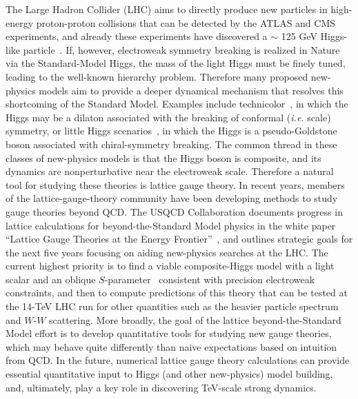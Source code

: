 The Large Hadron Collider (LHC) aims to directly produce new particles in
high-energy proton-proton collisions that can be detected by the ATLAS and CMS
experiments, and already these experiments have discovered a $\sim$ 125 GeV
Higgs-like particle~\cite{Aad:2012tfa,Chatrchyan:2012ufa}.  If, however,
electroweak symmetry breaking is realized in Nature via the Standard-Model
Higgs, the mass of the light Higgs must be finely tuned, leading to the
well-known hierarchy problem.  Therefore many proposed new-physics models aim
to provide a deeper dynamical mechanism that resolves this shortcoming of the
Standard Model.  Examples include technicolor~\cite{Farhi:1980xs,Hill:2002ap},
in which the Higgs may be a dilaton associated with the breaking of conformal
({\it i.e.} scale) symmetry, or little Higgs
scenarios~\cite{Kaplan:1983sm,ArkaniHamed:2002pa,ArkaniHamed:2002qy}, in which
the Higgs is a pseudo-Goldstone boson associated with chiral-symmetry
breaking.  The common thread in these classes of new-physics models is that
the Higgs boson is composite, and its dynamics are nonperturbative near the
electroweak scale.  Therefore a natural tool for studying these theories is
lattice gauge theory.  In recent years, members of the lattice-gauge-theory
community have been developing methods to study gauge theories beyond QCD.
The USQCD Collaboration documents progress in lattice calculations for
beyond-the-Standard Model physics in the white paper ``Lattice Gauge Theories
at the Energy Frontier''~\cite{USQCD_EF_whitepaper13}, and outlines strategic
goals for the next five years focusing on aiding new-physics searches at the
LHC.  The current highest priority is to find a viable composite-Higgs model
with a light scalar and an oblique $S$-parameter~\cite{Peskin:1990zt}
consistent with precision electroweak constraints, and then to compute
predictions of this theory that can be tested at the 14-TeV LHC run for other
quantities such as the heavier particle spectrum and $W$-$W$ scattering.  More
broadly, the goal of the lattice beyond-the-Standard Model effort is to
develop quantitative tools for studying new gauge theories, which may behave
quite differently than naive expectations based on intuition from QCD.  In the
future, numerical lattice gauge theory calculations can provide essential
quantitative input to Higgs (and other new-physics) model building, and,
ultimately, play a key role in discovering TeV-scale strong dynamics.

